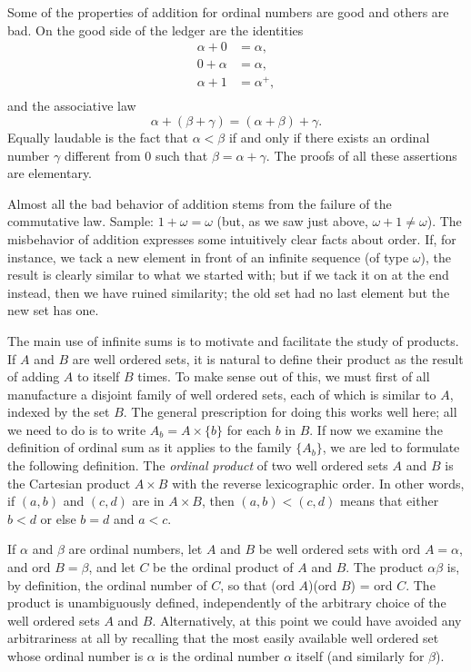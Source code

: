 Some of the properties of addition for ordinal numbers are good and others are bad. On the good side of the ledger are the identities 
\begin{align*}
\alpha + 0 &= \alpha , \\
0 + \alpha &= \alpha , \\
\alpha + 1 &= \alpha^{+} ,\\
\end{align*}
and the associative law 
\begin{equation*}
\alpha + (\beta + \gamma) = (\alpha + \beta) + \gamma .
\end{equation*}
Equally laudable is the fact that $\alpha < \beta$ if and only if there exists an ordinal number $\gamma$ different from $0$ such that $\beta =  \alpha + \gamma$. The proofs of all these assertions are elementary. 

Almost all the bad behavior of addition stems from the failure of the commutative law. Sample: $1 + \omega = \omega$ (but, as we saw just above, $\omega + 1 \neq \omega$). The misbehavior of addition expresses some intuitively clear facts about order. If, for instance, we tack a new element in front of an infinite sequence (of type $\omega$), the result is clearly similar to what we started with; but if we tack it on at the end instead, then we have ruined similarity; the old set had no last element but the new set has one. 

The main use of infinite sums is to motivate and facilitate the study of products. If $A$ and $B$ are well ordered sets, it is natural to define their product as the result of adding $A$ to itself $B$ times. To make sense out of this, we must first of all manufacture a disjoint family of well ordered sets, each of which is similar to $A$, indexed by the set $B$. The general prescription for doing this works well here; all we need to do is to write $A_{b} = A \times \{  b \}$ for each $b$ in $B$. If now we examine the definition of ordinal sum as it applies to the family $\{ A_{b} \}$, we are led to formulate the following definition. The \textit{ordinal product} of two well ordered sets $A$ and $B$ is the Cartesian product $A \times B$ with the reverse lexicographic order. In other words, if $(a,b)$ and $(c, d)$ are in $A \times B$, then $(a, b) < (c, d)$ means that either $b < d$ or else $b = d$ and $a < c$. 

If $\alpha$ and $\beta$ are ordinal numbers, let $A$ and $B$ be well ordered sets with ord $A = \alpha$, and ord $B = \beta$, and let $C$ be the ordinal product of $A$ and $B$. The product $\alpha \beta$ is, by definition, the ordinal number of $C$, so that (ord $A$)(ord $B$) = ord $C$. The product is unambiguously  defined, independently of the arbitrary choice of the well ordered sets $A$ and $B$. Alternatively, at this point we could have avoided any arbitrariness at all by recalling that the most easily available well ordered set whose  ordinal number is $\alpha$ is the ordinal number $\alpha$ itself (and similarly for $\beta$). 

